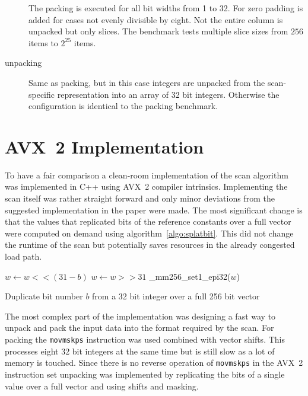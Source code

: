 \begin{description}
  The packing is executed for all bit widths from 1 to 32. For \bs{} zero
  padding is added for cases not evenly divisible by eight. Not the entire
  column is unpacked but only slices. The benchmark tests multiple slice sizes
  from $256$ items to $2^{25}$ items.

\item[unpacking]
  Same as packing, but in this case integers are unpacked from the
  scan-specific representation into an array of 32 bit integers. Otherwise the
  configuration is identical to the packing benchmark.
\end{description}

\section{AVX~2 \bwv{} Implementation}

To have a fair comparison a clean-room implementation of the \bwv{} scan
algorithm was implemented in C++ using AVX~2 compiler intrinsics. Implementing
the scan itself was rather straight forward and only minor deviations from the
suggested implementation in the paper were made. The most significant change is
that the values that replicated bits of the reference constants over a full
vector were computed on demand using algorithm~\ref{algo:splatbit}. This did not
change the runtime of the scan but potentially saves resources in the already
congested load path.

\begin{algorithm}[h]
\begin{algorithmic}[1]
  \State $w \gets w << (31-b)$ 
  \State $w \gets w >> 31$ 
  \State \Return \_mm256\_set1\_epi32($w$) 
  \EndProcedure
\end{algorithmic}
\caption{Duplicate bit number $b$ from a 32 bit integer over a
full 256 bit vector}
\label{algo:splatbit}
\end{algorithm}

The most complex part of the implementation was designing a fast way to unpack
and pack the input data into the format required by the \bwv{} scan. For packing
the \texttt{movmskps} instruction was used combined with vector shifts. This
processes eight 32 bit integers at the same time but is still slow as a lot of
memory is touched. Since there is no reverse operation of \texttt{movmskps} in
the AVX~2 instruction set unpacking was implemented by replicating the bits of a
single value over a full vector and using shifts and masking.

